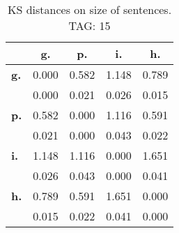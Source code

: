 \begin{table}[h!]
\begin{center}
\begin{tabular}{| l || c | c | c | c |}\hline
 & {\bf g.} & {\bf p.} & {\bf i.} & {\bf h.} \\\hline\hline
{\bf g.} & 0.000 & 0.582 & 1.148 & 0.789 \\
{\bf } & 0.000 & 0.021 & 0.026 & 0.015 \\\hline
{\bf p.} & 0.582 & 0.000 & 1.116 & 0.591 \\
{\bf } & 0.021 & 0.000 & 0.043 & 0.022 \\\hline
{\bf i.} & 1.148 & 1.116 & 0.000 & 1.651 \\
{\bf } & 0.026 & 0.043 & 0.000 & 0.041 \\\hline
{\bf h.} & 0.789 & 0.591 & 1.651 & 0.000 \\
{\bf } & 0.015 & 0.022 & 0.041 & 0.000 \\\hline
\end{tabular}
\caption{KS distances on size of sentences. TAG: 15}
\end{center}
\end{table}